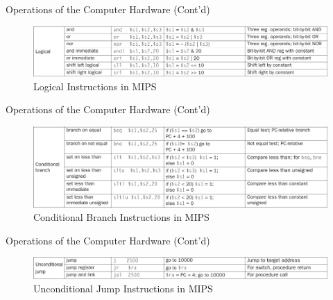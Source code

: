 \begin{frame}{Operations of the Computer Hardware (Cont'd)}
\begin{figure}\caption{Logical Instructions in MIPS}
\begin{center}
\includegraphics[width=\textwidth, height=0.4\textheight]{docs/images/operations-3}
\end{center}
\end{figure}
\end{frame}

\begin{frame}{Operations of the Computer Hardware (Cont'd)}
\begin{figure}\caption{Conditional Branch Instructions in MIPS}
\begin{center}
\includegraphics[width=\textwidth, height=0.5\textheight]{docs/images/operations-4}
\end{center}
\end{figure}
\end{frame}

\begin{frame}{Operations of the Computer Hardware (Cont'd)}
\begin{figure}\caption{Unconditional Jump Instructions in MIPS}
\begin{center}
\includegraphics[width=\textwidth, height=0.17\textheight]{docs/images/operations-5  }
\end{center}
\end{figure}
\end{frame}

